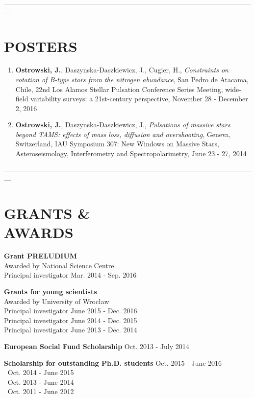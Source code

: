 \documentclass[margin, 10pt]{res} %
\begin{document}
\begin{resume}
---------------------------------------------------------------------------------------------------------------

\section{POSTERS}

\begin{enumerate}
    \item \textbf{Ostrowski, J.}, Daszynska-Daszkiewicz, J., Cugier, H., \textit{Constraints on rotation of B-type stars from the nitrogen abundance}, San Pedro de Atacama, Chile, 22nd Los Alamos Stellar Pulsation Conference Series Meeting, wide-field variability surveys: a 21st-century perspective, November 28 - December 2, 2016

    \item \textbf{Ostrowski, J.}, Daszynska-Daszkiewicz, J., \textit{Pulsations of massive stars beyond TAMS: effects of mass loss, diffusion and overshooting}, Geneva, Switzerland, IAU Symposium 307: New Windows on Massive Stars, Asteroseismology, Interferometry and Spectropolarimetry, June 23 - 27, 2014
\end{enumerate}

---------------------------------------------------------------------------------------------------------------

\section{GRANTS \& \\ AWARDS} 

{\bf Grant PRELUDIUM} \\
Awarded by National Science Centre \\
Principal investigator \hfill Mar. 2014 - Sep. 2016

{\bf Grants for young scientists} \\
Awarded by University of Wroc\l{}aw \\
Principal investigator \hfill June 2015 - Dec. 2016 \\
Principal investigator \hfill June 2014 - Dec. 2015 \\
Principal investigator \hfill June 2013 - Dec. 2014

{\bf European Social Fund Scholarship} \hfill Oct. 2013 - July 2014

{\bf Scholarship for outstanding Ph.D. students} \hfill Oct. 2015 - June 2016 \\
$~$ \hfill Oct. 2014 - June 2015 \\
$~$ \hfill Oct. 2013 - June 2014 \\
$~$ \hfill Oct. 2011 - June 2012 \\


\end{resume}
\end{document}
